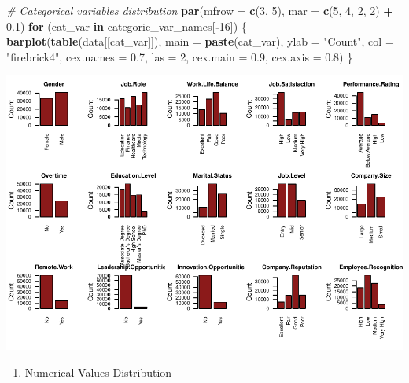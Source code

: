 \documentclass[
  10pt,
  paper=a4,
  ,captions=tableheading
]{scrartcl}
\newenvironment{Shaded}{\begin{snugshade}}{\end{snugshade}}
\newcommand{\AttributeTok}[1]{\textcolor[rgb]{0.13,0.29,0.53}{#1}}
\newcommand{\CommentTok}[1]{\textcolor[rgb]{0.56,0.35,0.01}{\textit{#1}}}
\newcommand{\ControlFlowTok}[1]{\textcolor[rgb]{0.13,0.29,0.53}{\textbf{#1}}}
\newcommand{\DecValTok}[1]{\textcolor[rgb]{0.00,0.00,0.81}{#1}}
\newcommand{\FloatTok}[1]{\textcolor[rgb]{0.00,0.00,0.81}{#1}}
\newcommand{\FunctionTok}[1]{\textcolor[rgb]{0.13,0.29,0.53}{\textbf{#1}}}
\newcommand{\NormalTok}[1]{#1}
\newcommand{\SpecialCharTok}[1]{\textcolor[rgb]{0.81,0.36,0.00}{\textbf{#1}}}
\newcommand{\StringTok}[1]{\textcolor[rgb]{0.31,0.60,0.02}{#1}}
\providecommand{\tightlist}{%
  \setlength{\itemsep}{0pt}\setlength{\parskip}{0pt}}
\begin{document}
\begin{Shaded}
\begin{Highlighting}[]
\CommentTok{\# Categorical variables distribution}
\FunctionTok{par}\NormalTok{(}\AttributeTok{mfrow =} \FunctionTok{c}\NormalTok{(}\DecValTok{3}\NormalTok{, }\DecValTok{5}\NormalTok{), }\AttributeTok{mar =} \FunctionTok{c}\NormalTok{(}\DecValTok{5}\NormalTok{, }\DecValTok{4}\NormalTok{, }\DecValTok{2}\NormalTok{, }\DecValTok{2}\NormalTok{) }\SpecialCharTok{+} \FloatTok{0.1}\NormalTok{)}
\ControlFlowTok{for}\NormalTok{ (cat\_var }\ControlFlowTok{in}\NormalTok{ categoric\_var\_names[}\SpecialCharTok{{-}}\DecValTok{16}\NormalTok{]) \{}
    \FunctionTok{barplot}\NormalTok{(}\FunctionTok{table}\NormalTok{(data[[cat\_var]]), }\AttributeTok{main =} \FunctionTok{paste}\NormalTok{(cat\_var), }\AttributeTok{ylab =} \StringTok{"Count"}\NormalTok{,}
        \AttributeTok{col =} \StringTok{"firebrick4"}\NormalTok{, }\AttributeTok{cex.names =} \FloatTok{0.7}\NormalTok{, }\AttributeTok{las =} \DecValTok{2}\NormalTok{, }\AttributeTok{cex.main =} \FloatTok{0.9}\NormalTok{, }\AttributeTok{cex.axis =} \FloatTok{0.8}\NormalTok{)}
\NormalTok{\}}
\end{Highlighting}
\end{Shaded}

\includegraphics{figs/data_catdist-1.pdf}

\small

\begin{enumerate}
\def\labelenumi{\arabic{enumi}.}
\setcounter{enumi}{4}
\tightlist
\item
  Numerical Values Distribution
\end{enumerate}
\end{document}
